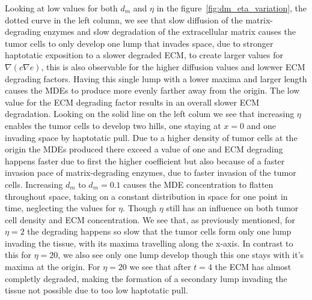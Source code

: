 Looking at low values for both $d_m$ and $\eta$ in the figure~\ref{fig:dm_eta_variation}, the dotted curve in the left column, we see that slow diffusion of the matrix-degrading enzymes and slow degradation of the extracellular matrix causes the tumor cells to only develop one lump that invades space, due to stronger haptotatic exposition to a slower degraded ECM, to create larger values for $\nabla (c \nabla e)$, this is also observable for the higher diffusion values and lowwer ECM degrading factors. Having this single lump with a lower maxima and larger length causes the MDEs to produce more evenly farther away from the origin. The low value for the ECM degrading factor results in an overall slower ECM degradation. Looking on the solid line on the left colum we see that increasing $\eta$ enables the tumor cells to develop two hills, one staying at $x=0$ and one invading space by haptotatic pull. Due to a higher density of tumor cells at the origin the MDEs produced there exceed a value of one and ECM degrading happens faster due to first the higher coefficient but also because of a faster invasion pace of matrix-degrading enzymes, due to faster invasion of the tumor cells. Increasing $d_m$ to $d_m=0.1$ causes the MDE concentration to flatten throughout space, taking on a constant distribution in space for one point in time, neglecting the values for $\eta$. Though $\eta$ still has an influence on both tumor cell density and ECM concentration. We see that, as previously mentioned, for $\eta=2$ the degrading happens so slow that the tumor cells form only one lump invading the tissue, with its maxima travelling along the x-axis. In contrast to this for $\eta=20$, we also see only one lump develop though this one stays with it's maxima at the origin. For $\eta=20$ we see that after $t=4$ the ECM has almost completly degraded, making the formation of a secondary lump invading the tissue not possible due to too low haptotatic pull. 

